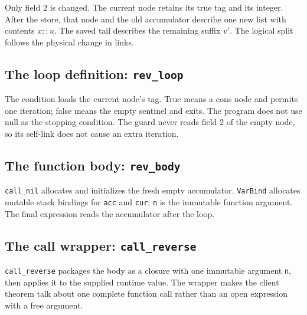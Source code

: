 \documentclass[11pt]{article}
\begin{document}
Only field \(2\) is changed. The current node retains its true tag and its
integer. After the store, that node and the old accumulator describe one new
list with contents \(x::u\). The saved tail describes the remaining suffix
\(v'\). The logical split follows the physical change in links.

\subsection{The loop definition: \texttt{rev\_loop}}

\begin{minipage}{\linewidth}

\end{minipage}

The condition loads the current node's tag. True means a cons node and permits
one iteration; false means the empty sentinel and exits. The program does not
use null as the stopping condition. The guard never reads field \(2\) of the
empty node, so its self-link does not cause an extra iteration.

\subsection{The function body: \texttt{rev\_body}}

\begin{minipage}{\linewidth}

\end{minipage}

\texttt{call\_nil} allocates and initializes the fresh empty accumulator.
\texttt{VarBind} allocates mutable stack bindings for \texttt{acc} and
\texttt{cur}; \texttt{n} is the immutable function argument. The final expression
reads the accumulator after the loop.

\subsection{The call wrapper: \texttt{call\_reverse}}

\begin{minipage}{\linewidth}

\end{minipage}

\texttt{call\_reverse} packages the body as a closure with one immutable
argument \texttt{n}, then applies it to the supplied runtime value. The
wrapper makes the client theorem talk about one complete function call rather
than an open expression with a free argument.
\end{document}
